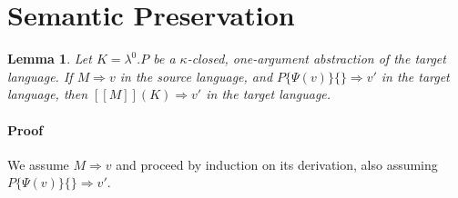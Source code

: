 \documentclass[a4paper,11pt]{article}
\newtheorem{lemma}{Lemma}
\begin{document}
\section{Semantic Preservation}\label{sec:semanticpreservation}

\begin{lemma}
  Let $K = \lambda^{0}.P$ be a $\kappa$-closed, one-argument
  abstraction of the target language. If $M \Rightarrow v$ in the
  source language, and $P\{\Psi(v)\}\{\} \Rightarrow v'$ in the target
  language, then $[\![M]\!](K) \Rightarrow v'$ in the target language.
\end{lemma}

\paragraph{Proof}

We assume $M \Rightarrow v$ and proceed by induction on its derivation, also
assuming $P\{\Psi(v)\}\{\} \Rightarrow v'$.

\end{document}
